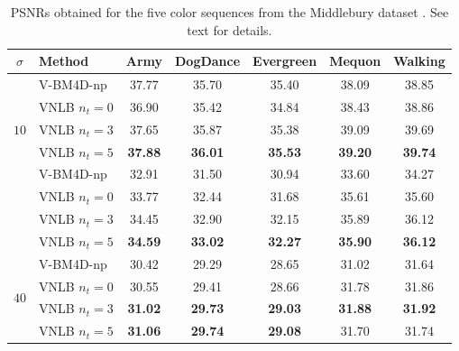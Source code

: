 \documentclass{llncs}
\newcommand{\best}[1]{\textbf{#1}}
\begin{document}
\begin{table}[htp!]
	\begin{center}
	\renewcommand{\tabcolsep}{2mm}
	\renewcommand{\arraystretch}{1.0}
	\begin{tabular}{ c | l |c c c c c}
		\hline
		\rule{0pt}{12pt}$\sigma$ & Method     & Army & DogDance & Evergreen & Mequon & Walking  \\\hline
		\multirow{5}{*}{$10$} & V-BM4D-np      &       37.77  &       35.70  &       35.40  &       38.09  &       38.85  \\
		                      & VNLB $n_t = 0$ &       36.90  &       35.42  &       34.84  &       38.43  &       38.86  \\
		                      & VNLB $n_t = 3$ &       37.65  &       35.87  &       35.38  &       39.09  &       39.69  \\
									 & VNLB $n_t = 5$ & \best{37.88} & \best{36.01} & \best{35.53} & \best{39.20} & \best{39.74} \\\hline
%									                                                                                           
		\multirow{5}{*}{$20$} & V-BM4D-np      &       32.91  &       31.50  &       30.94  &       33.60  &       34.27  \\
		                      & VNLB $n_t = 0$ &       33.77  &       32.44  &       31.68  &       35.61  &       35.60  \\
									 & VNLB $n_t = 3$ &       34.45  &       32.90  &       32.15  &       35.89  &       36.12  \\
									 & VNLB $n_t = 5$ & \best{34.59} & \best{33.02} & \best{32.27} & \best{35.90} & \best{36.12} \\\hline
%									                                                                                           
		\multirow{5}{*}{$40$} & V-BM4D-np      &       30.42  &       29.29  &       28.65  &       31.02  &       31.64  \\
		                      & VNLB $n_t = 0$ &       30.55  &       29.41  &       28.66  &       31.78  &       31.86  \\
									 & VNLB $n_t = 3$ & \best{31.02} & \best{29.73} & \best{29.03} & \best{31.88} & \best{31.92} \\
									 & VNLB $n_t = 5$ & \best{31.06} & \best{29.74} & \best{29.08} &       31.70  &       31.74  \\\hline
	\end{tabular}
	\end{center}
	\caption{PSNRs obtained for the five color sequences from the Middlebury
	dataset \cite{middleburyOflow}. See text for details.}
	\label{tab:psnr}
\end{table}
\end{document}
